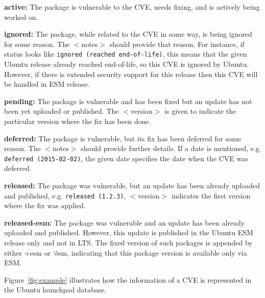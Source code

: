 \noindent\textbf{active:} The package is vulnerable to the
                CVE, needs fixing, and is actively being worked on.

\noindent\textbf{ignored:} The package, while related to the
                CVE in some way, is being ignored for some reason. The
		\(<\)notes\(>\) should provide that reason. For instance, if status looks like
		\texttt{ignored (reached end-of-life)}, this means that the given Ubuntu release already reached
                end-of-life, so this CVE is ignored by Ubuntu. However, if there
                is extended security support for this release then this
                CVE will be handled in ESM release.

\noindent\textbf{pending:} The package is vulnerable and
                  has been fixed but an update has not been yet uploaded or
		  published. The \(<\)version\(>\) is given to indicate the particular
                  version where the fix has been done.

\noindent\textbf{deferred:} The package is vulnerable, but
		   its fix has been deferred for some reason. The \(<\)notes\(>\)
                   should provide further details. If a date is mentioned, e.g.
		   \texttt{deferred (2015-02-02)}, the given date specifies the date when
                   the CVE was deferred.

\noindent\textbf{released:} The package was vulnerable, but
		an update has been already uploaded and published, e.g. \texttt{released (1.2.3)},
		\(<\)version\(>\) indicates the first version where the fix was applied.

\noindent\textbf{released-esm:} The package was vulnerable and
                an update has been already uploaded and published. However,
                this update is published in the Ubuntu ESM release only and not in LTS.
                The fixed version of such packages is appended by either
                +esm or \char`\~esm, indicating that this package version is available
                only via ESM.

\noindent Figure~\ref{fig:example} illustrates how the information of a CVE is represented
in the Ubuntu launchpad database.

\begin{center}
\label{fig:example}
\end{center}

